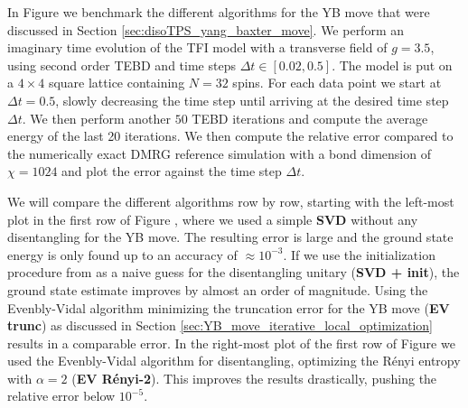 In Figure  we benchmark the different algorithms for the YB move that were discussed in Section \ref{sec:disoTPS_yang_baxter_move}. We perform an imaginary time evolution of the TFI model with a transverse field of $g = 3.5$, using second order TEBD and time steps $\Delta t \in \left[0.02, 0.5\right]$. The model is put on a $4\times4$ square lattice containing $N = 32$ spins. For each data point we start at $\Delta t = 0.5$, slowly decreasing the time step until arriving at the desired time step $\Delta t$. We then perform another $50$ TEBD iterations and compute the average energy of the last 20 iterations. We then compute the relative error compared to the numerically exact DMRG reference simulation with a bond dimension of $\chi = 1024$ and plot the error against the time step $\Delta t$. \par
%

%

%
We will compare the different algorithms row by row, starting with the left-most plot in the first row of Figure , where we used a simple \textbf{SVD} without any disentangling for the YB move. The resulting error is large and the ground state energy is only found up to an accuracy of $\approx10^{-3}$. If we use the initialization procedure from \cite{cite:isometric_tensor_network_states_in_two_dimensions, cite:efficient_simulation_of_dynamics_in_two_dimensional_quantum_spin_systems} as a naive guess for the disentangling unitary (\textbf{SVD + init}), the ground state estimate improves by almost an order of magnitude. Using the Evenbly-Vidal algorithm minimizing the truncation error for the YB move (\textbf{EV trunc}) as discussed in Section \ref{sec:YB_move_iterative_local_optimization} results in a comparable error. In the right-most plot of the first row of Figure  we used the Evenbly-Vidal algorithm for disentangling, optimizing the Rényi entropy with $\alpha = 2$ (\textbf{EV Rényi-2}). This improves the results drastically, pushing the relative error below $10^{-5}$. \par
